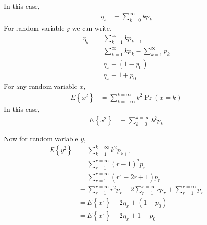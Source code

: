 \documentclass{beamer}
\providecommand{\pr}[1]{\ensuremath{\Pr\left(#1\right)}}
\providecommand{\brak}[1]{\ensuremath{\left(#1\right)}}
\providecommand{\cbrak}[1]{\ensuremath{\left\{#1\right\}}}
\begin{document}
\begin{frame}
In this case,
     \begin{align}
           \eta_{x} &= \sum_{k=0}^{\infty}kp_{k}
     \end{align}
For random variable $y$ we can write,
     \begin{align}
           \eta_{y}  &= \sum_{k=1}^{\infty}kp_{k+1}\\
                         &= \sum_{k=1}^{\infty}kp_{k} - \sum_{k=1}^{\infty}p_{k}\\
                         &= \eta_{x} -\brak{1 - p_{0}}\\
                         &= \eta_{x} - 1 + p_{0}
     \end{align}
For any random variable $x$,
     \begin{align}
           E\cbrak{x^{2}} &= \sum_{k=-\infty}^{k=\infty}k^{2}\pr{x=k}
     \end{align}
In this case,
     \begin{align}
            E\cbrak{x^{2}} &= \sum_{k=0}^{k=\infty}k^{2}p_{k}
    \end{align}
\end{frame}
\begin{frame}
Now for random variable $y$,
    \begin{align}
            E\cbrak{y^{2}} &= \sum_{k=1}^{k=\infty}k^{2}p_{k+1}\\
                                   &= \sum_{r=1}^{r=\infty}\brak{r-1}^{2}p_{r}\\
                                   &= \sum_{r=1}^{r=\infty}\brak{r^2-2r+1}p_{r}\\
                                   &= \sum_{r=1}^{r=\infty}r^2p_{r} -2 \sum_{r=1}^{r=\infty}rp_{r} +  \sum_{r=1}^{r=\infty}p_{r}\\
                                   & = E\cbrak{x^{2}} -2\eta_{x} + \brak{1-p_{0}}\\
                                   & =  E\cbrak{x^{2}} -2\eta_{x} + 1-p_{0}
    \end{align}
\end{frame}
\end{document}
